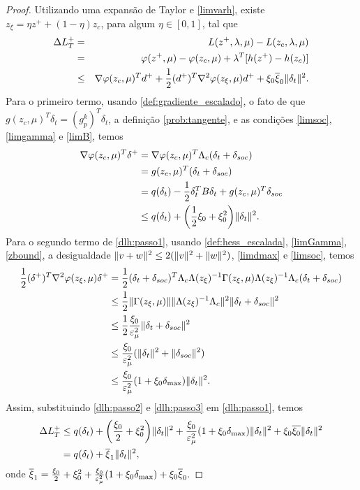 \begin{proof}
  Utilizando uma expans\~ao de Taylor e \eqref{limvarh}, existe $z_\xi = \eta
  z^+ + (1-\eta)z_c$, para algum $\eta\in[0,1]$, tal que
\begin{eqnarray} 
  \DHp & = & L(\zp,\lambda,\mu) - L(z_c,\lambda,\mu) \nonumber \\
   & = & \varphi(\zp,\mu) - \varphi(z_c,\mu) + \lambda^T[h(\zp) - h(z_c)]
  \nonumber \\
  & \leq & \nabla \varphi(z_c,\mu)^T\dplus + \meio(\dplus)^T\hess
  \varphi(\zxi,\mu)\dplus + \xi_0\bxi_0\norma{\dt}^2. \visiblelbl{dlh:passo1}
\end{eqnarray}
Para o primeiro termo, usando \eqref{def:gradiente_escalado}, o fato de que
$g(z_c,\mu)^T\delta_t = (g_p^k)^T\delta_t$, a definição \eqref{prob:tangente},
e as condições \eqref{limsoc}, \eqref{limgamma} e
\eqref{limB}, temos
\begin{align}
  \nabla\varphi(z_c,\mu)^T\delta^+ & = \nabla\varphi(z_c,\mu)^T\Lambda_c
  (\delta_t+\dsoc) \nonumber \\
  & = g(z_c,\mu)^T(\delta_t + \dsoc) \nonumber \\
  & = q(\delta_t) - \meio\delta_t^TB\delta_t + g(z_c,\mu)^T\dsoc \nonumber \\
  & \leq q(\delta_t) + \bigg(\meio\xi_0 + \xi_0^2\bigg)\norma{\delta_t}^2.
  \visiblelbl{dlh:passo2}
\end{align}
Para o segundo termo de \eqref{dlh:passo1}, usando \eqref{def:hess_escalada},
\eqref{limGamma}, \eqref{zbound}, a desigualdade $\Vert v+w\Vert^2 \leq 2(\Vert v\Vert^2
+ \Vert w\Vert^2)$, \eqref{limdmax} e \eqref{limsoc}, temos
\begin{align}
  \meio(\delta^+)^T\nabla^2\varphi(z_\xi,\mu)\delta^+ & =
    \meio(\delta_t+\dsoc)^T\Lambda_c\Lambda(z_{\xi})^{-1}\Gamma(z_{\xi},\mu)
    \Lambda(z_{\xi})^{-1}\Lambda_c(\delta_t + \dsoc) \nonumber \\
  & \leq \dfrac{1}{2}\norma{\Gamma(z_{\xi},\mu)} \norma{\Lambda(z_{\xi})^{-1}
    \Lambda_c}^2 \norma{\delta_t+\dsoc}^2  \nonumber \\
  & \leq \dfrac{1}{2} \dfrac{\xi_0}{\epsmu^2} \norma{\delta_t + \dsoc}^2
    \nonumber \\
  & \leq \frac{\xi_0}{\epsmu^2} (\norma{\delta_t}^2 + \norma{\dsoc}^2) \nonumber
    \\
  & \leq \frac{\xi_0}{\epsmu^2} (1+\xi_0\dmax)\norma{\delta_t}^2.
    \visiblelbl{dlh:passo3}
\end{align}
Assim, substituindo \eqref{dlh:passo2} e \eqref{dlh:passo3} em
\eqref{dlh:passo1}, temos
\begin{align}
  \DHp & \leq q(\delta_t) + \bigg(\frac{\xi_0}{2}+\xi_0^2\bigg)\norma{\delta_t}^2
  + \frac{\xi_0}{\epsmu^2}(1+\xi_0\dmax)\norma{\delta_t}^2
  + \xi_0\barra{\xi_0}\norma{\delta_t}^2 \nonumber \\
  & = q(\delta_t) + \barra{\xi}_1\norma{\delta_t}^2, \visiblelbl{auxdhp}
\end{align} 
onde $\overline{\xi}_1 = \frac{\xi_0}{2} + \xi_0^2 + \frac{\xi_0}{\varepsilon_{\mu}^2} (1 +
\xi_0\delta_{\max}) + \xi_0\overline{\xi}_0$.


\end{proof}

